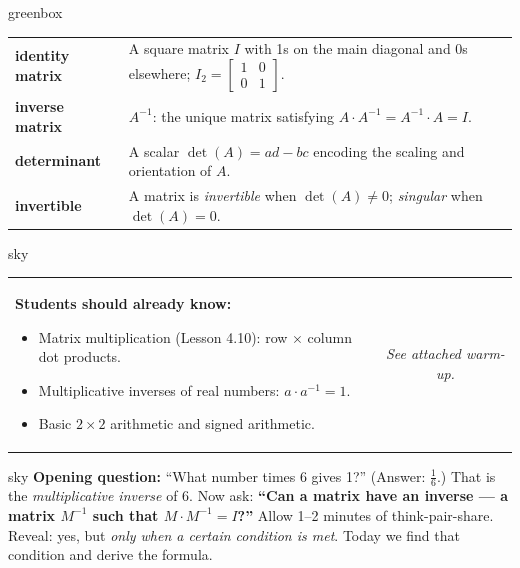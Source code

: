 \documentclass[10pt]{article}
\begin{document}
\begin{skillbox}{greenbox}
\renewcommand{\arraystretch}{1.5}
\begin{tabularx}{\linewidth}{@{} l X @{}}
    \textbf{identity matrix} & A square matrix $I$ with 1s on the main diagonal and 0s elsewhere;
        $I_2 = \begin{bmatrix}1&0\\0&1\end{bmatrix}$. \\
    \textbf{inverse matrix} & $A^{-1}$: the unique matrix satisfying $A \cdot A^{-1} = A^{-1} \cdot A = I$. \\
    \textbf{determinant} & A scalar $\det(A) = ad - bc$ encoding the scaling and orientation of $A$. \\
    \textbf{invertible} & A matrix is \textit{invertible} when $\det(A) \ne 0$; \textit{singular} when $\det(A) = 0$. \\
\end{tabularx}
\end{skillbox}

\begin{skillbox}{sky}
    \begin{tabularx}{\linewidth}{@{}X c@{}}
        \begin{minipage}[t]{0.58\linewidth}\vspace{0pt}
            \textbf{Students should already know:}
            \begin{itemize}[leftmargin=1.2em, itemsep=2pt]
                \item Matrix multiplication (Lesson 4.10): row $\times$ column dot products.
                \item Multiplicative inverses of real numbers: $a \cdot a^{-1} = 1$.
                \item Basic $2\times2$ arithmetic and signed arithmetic.
            \end{itemize}
        \end{minipage}
        &
        \begin{minipage}[t]{0.36\linewidth}\vspace{0pt}\centering
            \textit{See attached warm-up.}
        \end{minipage}
    \end{tabularx}
\end{skillbox}

\begin{skillbox}[Hook]{sky}
    \textbf{Opening question:} ``What number times 6 gives 1?'' (Answer: $\tfrac{1}{6}$.)
    That is the \emph{multiplicative inverse} of 6. Now ask: \textbf{``Can a matrix have an
    inverse --- a matrix $M^{-1}$ such that $M \cdot M^{-1} = I$?''}
    Allow 1--2 minutes of think-pair-share. Reveal: yes, but \emph{only when a certain
    condition is met}. Today we find that condition and derive the formula.
\end{skillbox}
\end{document}
